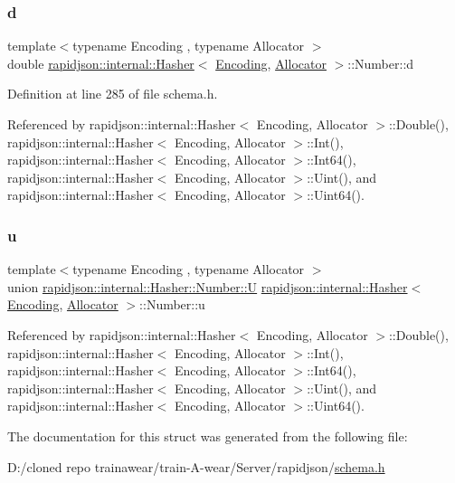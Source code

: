 \subsubsection{\texorpdfstring{d}{d}}
{\footnotesize\ttfamily template$<$typename Encoding , typename Allocator $>$ \\
double \mbox{\hyperlink{classrapidjson_1_1internal_1_1_hasher}{rapidjson\+::internal\+::\+Hasher}}$<$ \mbox{\hyperlink{classrapidjson_1_1_encoding}{Encoding}}, \mbox{\hyperlink{classrapidjson_1_1_allocator}{Allocator}} $>$\+::Number\+::d}



Definition at line 285 of file schema.\+h.



Referenced by rapidjson\+::internal\+::\+Hasher$<$ Encoding, Allocator $>$\+::\+Double(), rapidjson\+::internal\+::\+Hasher$<$ Encoding, Allocator $>$\+::\+Int(), rapidjson\+::internal\+::\+Hasher$<$ Encoding, Allocator $>$\+::\+Int64(), rapidjson\+::internal\+::\+Hasher$<$ Encoding, Allocator $>$\+::\+Uint(), and rapidjson\+::internal\+::\+Hasher$<$ Encoding, Allocator $>$\+::\+Uint64().

\mbox{\label{structrapidjson_1_1internal_1_1_hasher_1_1_number_a3aaf6704e9fa85034397b7086ada509a}} 
\subsubsection{\texorpdfstring{u}{u}}
{\footnotesize\ttfamily template$<$typename Encoding , typename Allocator $>$ \\
union \mbox{\hyperlink{unionrapidjson_1_1internal_1_1_hasher_1_1_number_1_1_u}{rapidjson\+::internal\+::\+Hasher\+::\+Number\+::U}} \mbox{\hyperlink{classrapidjson_1_1internal_1_1_hasher}{rapidjson\+::internal\+::\+Hasher}}$<$ \mbox{\hyperlink{classrapidjson_1_1_encoding}{Encoding}}, \mbox{\hyperlink{classrapidjson_1_1_allocator}{Allocator}} $>$\+::Number\+::u}



Referenced by rapidjson\+::internal\+::\+Hasher$<$ Encoding, Allocator $>$\+::\+Double(), rapidjson\+::internal\+::\+Hasher$<$ Encoding, Allocator $>$\+::\+Int(), rapidjson\+::internal\+::\+Hasher$<$ Encoding, Allocator $>$\+::\+Int64(), rapidjson\+::internal\+::\+Hasher$<$ Encoding, Allocator $>$\+::\+Uint(), and rapidjson\+::internal\+::\+Hasher$<$ Encoding, Allocator $>$\+::\+Uint64().



The documentation for this struct was generated from the following file\+:\begin{DoxyCompactItemize}
\item 
D\+:/cloned repo trainawear/train-\/\+A-\/wear/\+Server/rapidjson/\mbox{\hyperlink{schema_8h}{schema.\+h}}\end{DoxyCompactItemize}
